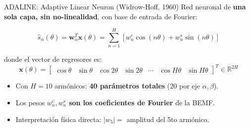 
\begin{frame}{ADALINE: Adaptive Linear Neuron (Widrow-Hoff, 1960)}
    Red neuronal de \textbf{una sola capa, sin no-linealidad}, con base de entrada de Fourier:
    
    \begin{equation}
        \hat{s}_\alpha(\theta) = \mathbf{w}_\alpha^T \mathbf{x}(\theta) = \sum_{n=1}^{H} \left[ w_n^c \cos(n\theta) + w_n^s \sin(n\theta) \right]
    \end{equation}
    
    donde el vector de regresores es:
    \begin{equation}
        \mathbf{x}(\theta) = \begin{bmatrix} \cos\theta & \sin\theta & \cos 2\theta & \sin 2\theta & \cdots & \cos H\theta & \sin H\theta \end{bmatrix}^T \in \mathbb{R}^{2H}
    \end{equation}
    
    \begin{itemize}
        \item Con $H = 10$ armónicos: \textbf{40 parámetros totales} (20 por eje $\alpha, \beta$).
        \item Los pesos $w_n^c, w_n^s$ \textbf{son los coeficientes de Fourier} de la BEMF.
        \item Interpretación física directa: $|w_5| = $ amplitud del 5to armónico.
    \end{itemize}
\end{frame}

